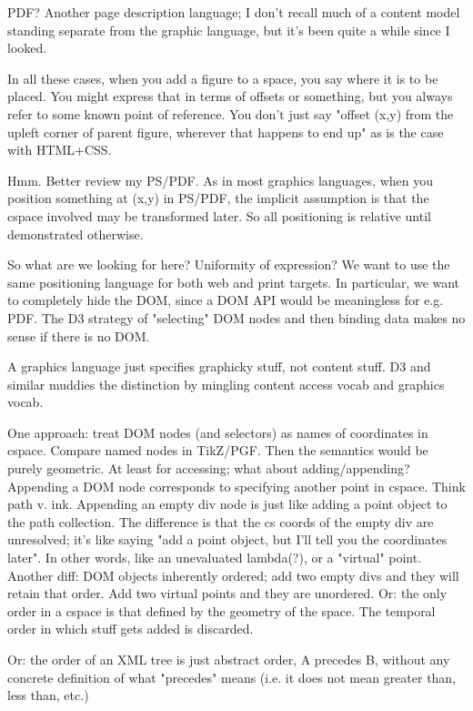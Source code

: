\documentclass[reqno,12pt]{tufte-handout}
\numberwithin{equation}{subsection}
\numberwithin{equation}{subsection}
\begin{document}
PDF?  Another page description language; I don't recall much of a
content model standing separate from the graphic language, but it's
been quite a while since I looked.

In all these cases, when you add a figure to a space, you say where it
is to be placed.  You might express that in terms of offsets or
something, but you always refer to some known point of reference.  You
don't just say "offset (x,y) from the upleft corner of parent
figure, wherever that happens to end up" as is the case with HTML+CSS.

Hmm.  Better review my PS/PDF.  As in most graphics languages, when
you position something at (x,y) in PS/PDF, the implicit assumption is
that the cspace involved may be transformed later.  So all positioning
is relative until demonstrated otherwise.

So what are we looking for here?  Uniformity of expression?  We want
to use the same positioning language for both web and print targets.
In particular, we want to completely hide the DOM, since a DOM API
would be meaningless for e.g. PDF.  The D3 strategy of "selecting" DOM
nodes and then binding data makes no sense if there is no DOM.

A graphics language just specifies graphicky stuff, not content stuff.
D3 and similar muddies the distinction by mingling content access
vocab and graphics vocab.

One approach: treat DOM nodes (and selectors) as names of coordinates
in cspace.  Compare named nodes in TikZ/PGF.  Then the semantics would
be purely geometric.  At least for accessing; what about
adding/appending?  Appending a DOM node corresponds to specifying
another point in cspace.  Think path v. ink.  Appending an empty div
node is just like adding a point object to the path collection.  The
difference is that the cs coords of the empty div are unresolved; it's
like saying "add a point object, but I'll tell you the coordinates
later".  In other words, like an unevaluated lambda(?), or a "virtual"
point.  Another diff: DOM objects inherently ordered; add two empty
divs and they will retain that order.  Add two virtual points and they
are unordered.  Or: the only order in a cspace is that defined by the
geometry of the space.  The temporal order in which stuff gets added
is discarded.

Or: the order of an XML tree is just abstract order, A precedes B,
without any concrete definition of what "precedes" means (i.e. it does
not mean greater than, less than, etc.)
\end{document}
